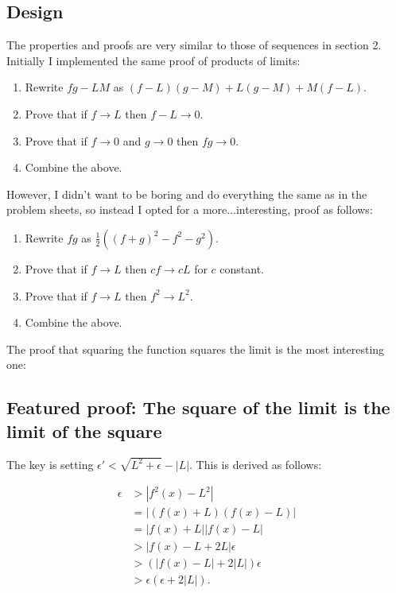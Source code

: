 \documentclass[a4paper, twoside, 11pt]{article}
\theoremstyle{definition}
\theoremstyle{plain}
\theoremstyle{remark}
\begin{document}
\subsection*{Design}

The properties and proofs are very similar to those of sequences in section 2. Initially I implemented the same proof of products of limits:
\begin{enumerate}
    \item Rewrite $fg - LM$ as $(f - L)(g - M) + L(g - M) + M(f - L)$.
    \item Prove that if $f \rightarrow L$ then $f - L \rightarrow 0$.
    \item Prove that if $f \rightarrow 0$ and $g \rightarrow 0$ then $fg \rightarrow 0$.
    \item Combine the above.
\end{enumerate}

However, I didn't want to be boring and do everything the same as in the problem sheets, so instead I opted for a more...interesting, proof as follows:
\begin{enumerate}
    \item Rewrite $fg$ as $\frac{1}{2}\left( \left( f + g \right)^{2} - f^{2} - g^{2} \right)$.
    \item Prove that if $f \rightarrow L$ then $cf \rightarrow cL$ for $c$ constant.
    \item Prove that if $f \rightarrow L$ then $f^{2} \rightarrow L^{2}$.
    \item Combine the above.
\end{enumerate}

The proof that squaring the function squares the limit is the most interesting one:

\subsection*{Featured proof: The square of the limit is the limit of the square}

The key is setting $\epsilon' < \sqrt{L^{2} + \epsilon} - \left\lvert L \right\rvert$. This is derived as follows:

\begin{align*}
    \epsilon
    &> \left\lvert f^{2}(x) - L^{2} \right\rvert \\
    &= \left\lvert (f(x) + L)(f(x) - L) \right\rvert \\
    &= \left\lvert f(x) + L \right\rvert \left\lvert f(x) - L \right\rvert \\
    &> \left\lvert f(x) - L + 2L \right\rvert \epsilon \\
    &> \left(\left\lvert f(x) - L \right\rvert + 2 \left\lvert L \right\rvert\right)\epsilon \\
    &> \epsilon\left( \epsilon + 2|L| \right)
.\end{align*}
\end{document}
